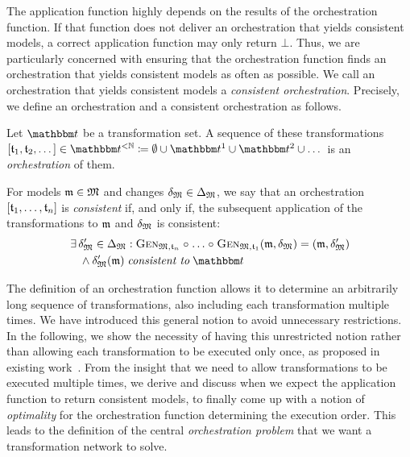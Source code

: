 The application function highly depends on the results of the orchestration function.
If that function does not deliver an orchestration that yields consistent models, a correct application function may only return $\bot$.
Thus, we are particularly concerned with ensuring that the orchestration function finds an orchestration that yields consistent models as often as possible.
We call an orchestration that yields consistent models a \emph{consistent orchestration}.
Precisely, we define an orchestration and a consistent orchestration as follows.
\begin{definition}[Orchestration]
    Let $\transformationset{T}$ be a transformation set.
    A sequence of these transformations $\sequenced{\transformation{t}_{1}, \transformation{t}_{2}, \dots} \in \transformationset{T}^{< \mathbb{N}} \equalsperdefinition \emptyset \cup \transformationset{T}^1 \cup \transformationset{T}^2 \cup \dots$ is an \emph{orchestration} of them.

    For models $\modeltuple{m} \in \metamodeltuple{M}$ and changes $\changetuple{\metamodeltuple{M}} \in \changeuniverse{\metamodeltuple{M}}$, we say that an orchestration $\sequenced{\transformation{t}_{1}, \dots, \transformation{t}_{n}}$ is \emph{consistent} if, and only if, the subsequent application of the transformations to $\modeltuple{m}$ and $\changetuple{\metamodeltuple{M}}$  is consistent: 
    \begin{align*}
        &
        \exists \changetuple{\metamodeltuple{M}}' \in \changeuniverse{\metamodeltuple{M}} : \generalizationfunction{\metamodeltuple{M},\transformation{t}_{n}} \concatfunction \dots \concatfunction \generalizationfunction{\metamodeltuple{M},\transformation{t}_{1}}(\modeltuple{m}, \changetuple{\metamodeltuple{M}}) = (\modeltuple{m}, \changetuple{\metamodeltuple{M}}') \\
        & \formulaskip
        \land \changetuple{\metamodeltuple{M}}'(\modeltuple{m}) \consistenttomath \transformationset{T}
    \end{align*}
\end{definition}

The definition of an orchestration function allows it to determine an arbitrarily long sequence of transformations, also including each transformation multiple times.
We have introduced this general notion to avoid unnecessary restrictions.
In the following, we show the necessity of having this unrestricted notion rather than allowing each transformation to be executed only once, as proposed in existing work~\cite{stevens2020BidirectionalTransformationLarge-SoSym}.
From the insight that we need to allow transformations to be executed multiple times, we derive and discuss when we expect the application function to return consistent models, to finally come up with a notion of \emph{optimality} for the orchestration function determining the execution order.
This leads to the definition of the central \emph{orchestration problem} that we want a transformation network to solve.

